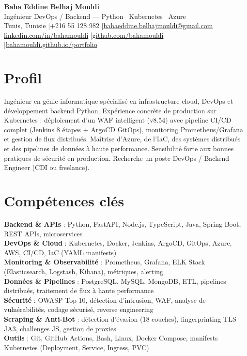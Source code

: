 \documentclass[a4paper,10pt]{article}
\begin{document}
\begin{center}
{\LARGE\bfseries\color{navy} Baha Eddine Belhaj Mouldi}\\[3pt]
{\large Ingénieur DevOps / Backend --- Python \textbar\ Kubernetes \textbar\ Azure}\\[5pt]
Tunis, Tunisie \quad|\quad +216 55 128 982 \quad|\quad \href{mailto:bahaeddine.belhajmouldi@gmail.com}{bahaeddine.belhajmouldi@gmail.com}\\[1pt]
\href{https://www.linkedin.com/in/bahamouldi}{linkedin.com/in/bahamouldi} \quad|\quad \href{https://github.com/bahamouldi}{github.com/bahamouldi} \quad|\quad \href{https://bahamouldi.github.io/portfolio/}{bahamouldi.github.io/portfolio}
\end{center}
\vspace{1pt}
\section{Profil}
Ingénieur en génie informatique spécialisé en infrastructure cloud, DevOps et développement backend Python. Expérience concrète de production sur Kubernetes : déploiement d'un WAF intelligent (v8.54) avec pipeline CI/CD complet (Jenkins 8 étapes + ArgoCD GitOps), monitoring Prometheus/Grafana et gestion de flux distribués. Maîtrise d'Azure, de l'IaC, des systèmes distribués et des pipelines de données à haute performance. Sensibilité forte aux bonnes pratiques de sécurité en production. Recherche un poste DevOps / Backend Engineer (CDI ou freelance).
\section{Compétences clés}
\textbf{Backend \& APIs} : Python, FastAPI, Node.js, TypeScript, Java, Spring Boot, REST APIs, microservices\\[0.5pt]
\textbf{DevOps \& Cloud} : Kubernetes, Docker, Jenkins, ArgoCD, GitOps, Azure, AWS, CI/CD, IaC (YAML manifests)\\[0.5pt]
\textbf{Monitoring \& Observabilité} : Prometheus, Grafana, ELK Stack (Elasticsearch, Logstash, Kibana), métriques, alerting\\[0.5pt]
\textbf{Données \& Pipelines} : PostgreSQL, MySQL, MongoDB, ETL, pipelines distribués, traitement de flux à haute performance\\[0.5pt]
\textbf{Sécurité} : OWASP Top 10, détection d'intrusion, WAF, analyse de vulnérabilités, codage sécurisé, reverse engineering\\[0.5pt]
\textbf{Scraping \& Anti-Bot} : détection d'évasion (18 couches), fingerprinting TLS JA3, challenges JS, gestion de proxies\\[0.5pt]
\textbf{Outils} : Git, GitHub Actions, Bash, Linux, Docker Compose, manifests Kubernetes (Deployment, Service, Ingress, PVC)
\end{document}

